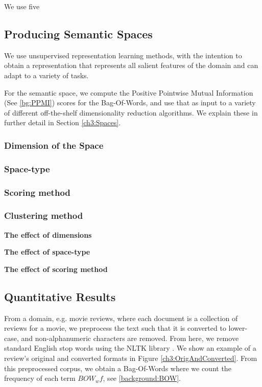 We use five 

\subsection{Producing Semantic Spaces}

We use unsupervised representation learning methods, with the intention to obtain a representation that represents all salient features of the domain and can adapt to a variety of tasks. 

For the semantic space, we compute the Positive Pointwise Mutual Information (See \ref{bg:PPMI}) scores for the Bag-Of-Words, and use that as input to a variety of different off-the-shelf dimensionality reduction algorithms. We explain these in further detail in Section \ref{ch3:Spaces}. 

\subsubsection{Dimension of the Space}

\subsubsection{Space-type}

\subsubsection{Scoring method}

\subsubsection{Clustering method}

\textbf{The effect of dimensions}


\textbf{The effect of space-type}

\textbf{The effect of scoring method}

\subsection{Quantitative Results}
From a domain, e.g. movie reviews, where each document is a collection of reviews for a movie, we preprocess the text such that it is converted to lower-case, and non-alphanumeric characters are removed. From here, we remove standard English stop words using the NLTK library \cite{Bird}. We show an example of a review's original and converted formats in Figure \ref{ch3:OrigAndConverted}. From this preprocessed corpus, we obtain a Bag-Of-Words where we count the frequency of each term $BOW_wf$, see \ref{background:BOW}. 


